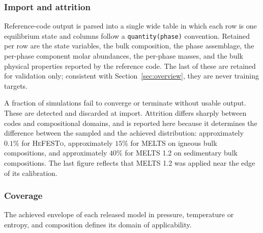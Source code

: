 
\subsubsection{Import and attrition}

Reference-code output is parsed into a single wide table in which each row is one
equilibrium state and columns follow a \texttt{quantity(phase)} convention. Retained
per row are the state variables, the bulk composition, the phase assemblage, the
per-phase component molar abundances, the per-phase masses, and the bulk physical
properties reported by the reference code. The last of these are retained for
validation only; consistent with Section~\ref{sec:overview}, they are never training
targets.

A fraction of simulations fail to converge or terminate without usable output. These
are detected and discarded at import. Attrition differs sharply between codes and
compositional domains, and is reported here because it determines the difference
between the sampled and the achieved distribution: approximately $0.1\%$ for
\textsc{HeFESTo}, approximately $15\%$ for \textsc{MELTS} on igneous bulk
compositions, and approximately $40\%$ for \textsc{MELTS} 1.2 on sedimentary bulk
compositions. The last figure reflects that \textsc{MELTS} 1.2 was applied near the
edge of its calibration.

\subsubsection{Coverage}

The achieved envelope of each released model in pressure, temperature or entropy,
and composition defines its domain of applicability.

%

